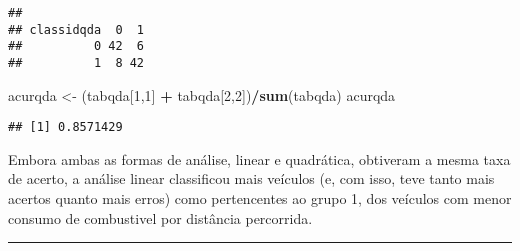 \documentclass[]{article}
\newenvironment{Shaded}{\begin{snugshade}}{\end{snugshade}}
\newcommand{\KeywordTok}[1]{\textcolor[rgb]{0.13,0.29,0.53}{\textbf{#1}}}
\newcommand{\DataTypeTok}[1]{\textcolor[rgb]{0.13,0.29,0.53}{#1}}
\newcommand{\DecValTok}[1]{\textcolor[rgb]{0.00,0.00,0.81}{#1}}
\newcommand{\StringTok}[1]{\textcolor[rgb]{0.31,0.60,0.02}{#1}}
\newcommand{\OperatorTok}[1]{\textcolor[rgb]{0.81,0.36,0.00}{\textbf{#1}}}
\newcommand{\NormalTok}[1]{#1}
\begin{document}
\begin{Shaded}
\end{Shaded}

\begin{verbatim}
##           
## classidqda  0  1
##          0 42  6
##          1  8 42
\end{verbatim}

\begin{Shaded}
\begin{Highlighting}[]
\NormalTok{acurqda <-}\StringTok{ }\NormalTok{(tabqda[}\DecValTok{1}\NormalTok{,}\DecValTok{1}\NormalTok{] }\OperatorTok{+}\StringTok{ }\NormalTok{tabqda[}\DecValTok{2}\NormalTok{,}\DecValTok{2}\NormalTok{])}\OperatorTok{/}\KeywordTok{sum}\NormalTok{(tabqda)}
\NormalTok{acurqda}
\end{Highlighting}
\end{Shaded}

\begin{verbatim}
## [1] 0.8571429
\end{verbatim}

Embora ambas as formas de análise, linear e quadrática, obtiveram a
mesma taxa de acerto, a análise linear classificou mais veículos (e, com
isso, teve tanto mais acertos quanto mais erros) como pertencentes ao
grupo 1, dos veículos com menor consumo de combustivel por distância
percorrida.

\begin{center}\rule{0.5\linewidth}{\linethickness}\end{center}
\end{document}
